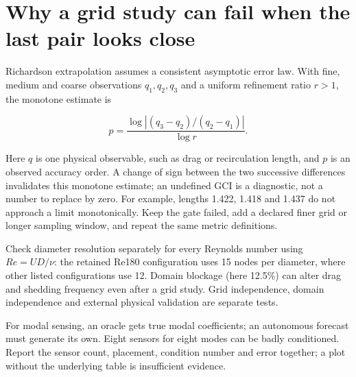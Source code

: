 \section*{Why a grid study can fail when the last pair looks close}
Richardson extrapolation assumes a consistent asymptotic error law. With fine,
medium and coarse observations $q_1,q_2,q_3$ and a uniform refinement ratio $r>1$,
the monotone estimate is

\[p=\frac{\log |(q_3-q_2)/(q_2-q_1)|}{\log r}.\]

Here $q$ is one physical observable, such as drag or recirculation length, and
$p$ is an observed accuracy order. A change of sign between the two successive
differences invalidates this monotone estimate; an undefined GCI is a diagnostic,
not a number to replace by zero. For example, lengths 1.422, 1.418 and 1.437 do
not approach a limit monotonically. Keep the gate failed, add a declared finer
grid or longer sampling window, and repeat the same metric definitions.

Check diameter resolution separately for every Reynolds number using
$Re=UD/\nu$: the retained Re180 configuration uses 15 nodes per diameter,
where other listed configurations use 12. Domain blockage (here 12.5\%) can alter
drag and shedding frequency even after a grid study. Grid independence, domain
independence and external physical validation are separate tests.

For modal sensing, an oracle gets true modal coefficients; an autonomous forecast
must generate its own. Eight sensors for eight modes can be badly conditioned.
Report the sensor count, placement, condition number and error together; a plot
without the underlying table is insufficient evidence.
